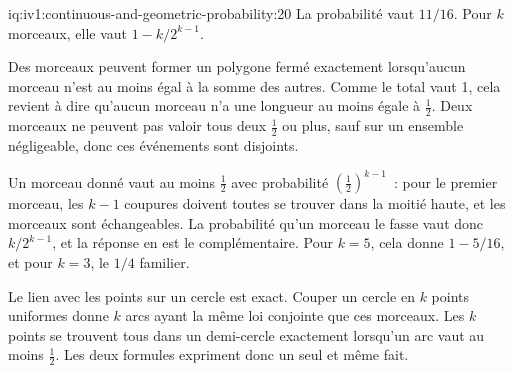 \begin{solution}{iq:iv1:continuous-and-geometric-probability:20}
La probabilité vaut $11/16$. Pour $k$ morceaux, elle vaut $1 - k/2^{k - 1}$.

Des morceaux peuvent former un polygone fermé exactement lorsqu'aucun morceau n'est au moins égal à la somme des autres. Comme le total vaut 1, cela revient à dire qu'aucun morceau n'a une longueur au moins égale à $\tfrac12$. Deux morceaux ne peuvent pas valoir tous deux $\tfrac12$ ou plus, sauf sur un ensemble négligeable, donc ces événements sont disjoints.

Un morceau donné vaut au moins $\tfrac12$ avec probabilité $(\tfrac12)^{k - 1}$~: pour le premier morceau, les $k - 1$ coupures doivent toutes se trouver dans la moitié haute, et les morceaux sont échangeables. La probabilité qu'un morceau le fasse vaut donc $k/2^{k - 1}$, et la réponse en est le complémentaire. Pour $k = 5$, cela donne $1 - 5/16$, et pour $k = 3$, le $1/4$ familier.

Le lien avec les points sur un cercle est exact. Couper un cercle en $k$ points uniformes donne $k$ arcs ayant la même loi conjointe que ces morceaux. Les $k$ points se trouvent tous dans un demi-cercle exactement lorsqu'un arc vaut au moins $\tfrac12$. Les deux formules expriment donc un seul et même fait.

\end{solution}

